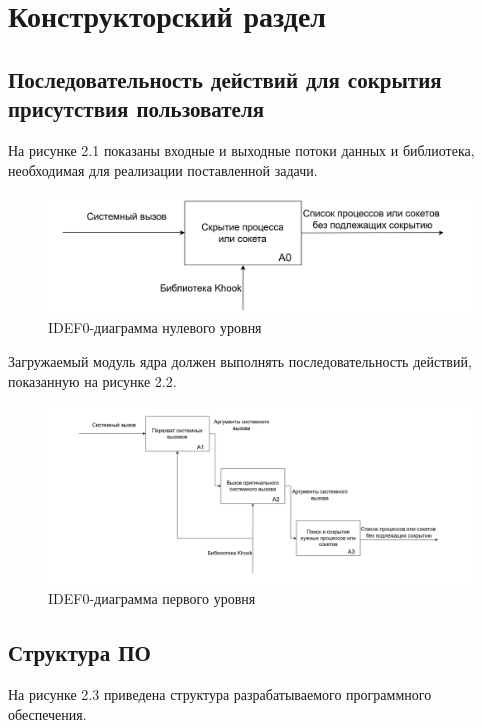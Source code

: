 \chapter{Конструкторский раздел}%
\label{cha:konstruktorskii_razdel}

\section{Последовательность действий для сокрытия присутствия пользователя}

На рисунке 2.1 показаны входные и выходные потоки данных и библиотека, необходимая для реализации поставленной задачи.

\begin{figure}[H]
    \centering
    \includegraphics[scale=0.75]{pdf/1.png}
    \caption{IDEF0-диаграмма нулевого уровня}\label{img:net_hide_schemeeqq}
\end{figure}

Загружаемый модуль ядра должен выполнять последовательность действий, показанную на рисунке 2.2.

\begin{figure}[H]
    \centering
    \includegraphics[scale=0.75]{pdf/2.png}
    \caption{IDEF0-диаграмма первого уровня}\label{img:net_hide_schemeeqq1}
\end{figure}


\section{Структура ПО}
На рисунке 2.3 приведена структура разрабатываемого программного обеспечения.

